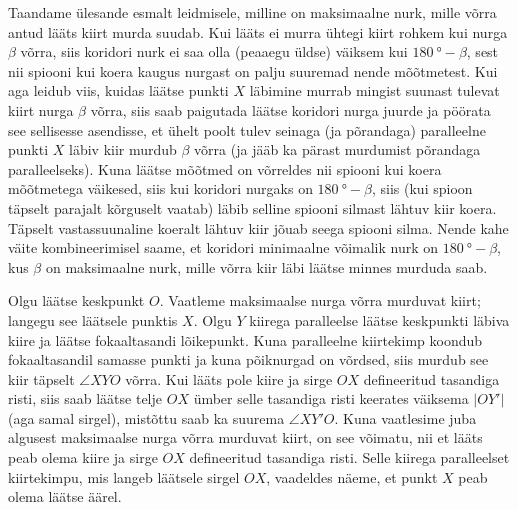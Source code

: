 \documentclass[11pt,a5paper]{article}
\begin{document}
Taandame ülesande esmalt leidmisele, milline on maksimaalne nurk, mille võrra antud lääts kiirt murda suudab. Kui lääts ei murra ühtegi kiirt rohkem kui nurga $\beta$ võrra, siis koridori nurk ei saa olla (peaaegu üldse) väiksem kui $\SI{180}{\degree} - \beta$, sest nii spiooni kui koera kaugus nurgast on palju suuremad nende mõõtmetest. Kui aga leidub viis, kuidas läätse punkti $X$ läbimine murrab mingist suunast tulevat kiirt nurga $\beta$ võrra, siis saab paigutada läätse koridori nurga juurde ja pöörata see sellisesse asendisse, et ühelt poolt tulev seinaga (ja põrandaga) paralleelne punkti $X$ läbiv kiir murdub $\beta$ võrra (ja jääb ka pärast murdumist põrandaga paralleelseks). Kuna läätse mõõtmed on võrreldes nii spiooni kui koera mõõtmetega väikesed, siis kui koridori nurgaks on $\SI{180}{\degree} - \beta$, siis (kui spioon täpselt parajalt kõrguselt vaatab) läbib selline spiooni silmast lähtuv kiir koera. Täpselt vastassuunaline koeralt lähtuv kiir jõuab seega spiooni silma. Nende kahe väite kombineerimisel saame, et koridori minimaalne võimalik nurk on $\SI{180}{\degree}-\beta$, kus $\beta$ on maksimaalne nurk, mille võrra kiir läbi läätse minnes murduda saab. 

Olgu läätse keskpunkt $O$. Vaatleme maksimaalse nurga võrra murduvat kiirt; langegu see läätsele punktis $X$. Olgu $Y$ kiirega paralleelse läätse keskpunkti läbiva kiire ja läätse fokaaltasandi lõikepunkt. Kuna paralleelne kiirtekimp koondub fokaaltasandil samasse punkti ja kuna põiknurgad on võrdsed, siis murdub see kiir täpselt $\angle XYO$ võrra. Kui lääts pole kiire ja sirge $OX$ defineeritud tasandiga risti, siis saab läätse telje $OX$ ümber selle tasandiga risti keerates väiksema $|OY'|$ (aga samal sirgel), mistõttu saab ka suurema $\angle XY'O$. Kuna vaatlesime juba algusest maksimaalse nurga võrra murduvat kiirt, on see võimatu, nii et lääts peab olema kiire ja sirge $OX$ defineeritud tasandiga risti. Selle kiirega paralleelset kiirtekimpu, mis langeb läätsele sirgel $OX$, vaadeldes näeme, et punkt $X$ peab olema läätse äärel. 
\end{document}
